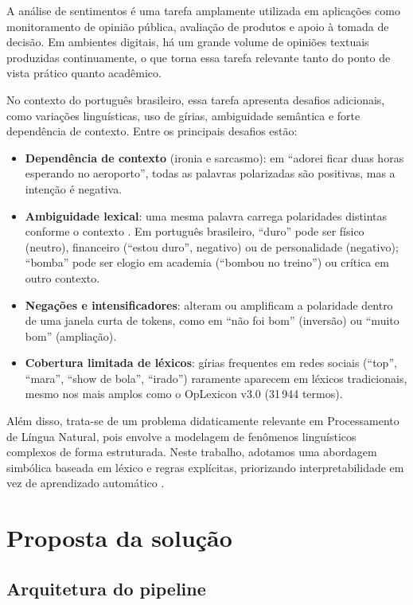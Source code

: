 \documentclass[11pt,a4paper]{article}
\newcommand{\new}[1]{\textcolor{newblue}{#1}}
\begin{document}
A análise de sentimentos é uma tarefa amplamente utilizada em aplicações como monitoramento de opinião pública, avaliação de produtos e apoio à tomada de decisão. Em ambientes digitais, há um grande volume de opiniões textuais produzidas continuamente, o que torna essa tarefa relevante tanto do ponto de vista prático quanto acadêmico.

No contexto do português brasileiro, essa tarefa apresenta desafios adicionais, como variações linguísticas, uso de gírias, ambiguidade semântica e forte dependência de contexto. Entre os principais desafios estão:

\begin{itemize}
  \item \textbf{Dependência de contexto} (ironia e sarcasmo)\new{: em ``adorei ficar duas horas esperando no aeroporto'', todas as palavras polarizadas são positivas, mas a intenção é negativa.}
  \item \textbf{Ambiguidade lexical}\new{: uma mesma palavra carrega polaridades distintas conforme o contexto \citep{navigli2009wsd}. Em português brasileiro, ``duro'' pode ser físico (neutro), financeiro (``estou duro'', negativo) ou de personalidade (negativo); ``bomba'' pode ser elogio em academia (``bombou no treino'') ou crítica em outro contexto.}
  \item \textbf{Negações e intensificadores}\new{: alteram ou amplificam a polaridade dentro de uma janela curta de tokens, como em ``não foi bom'' (inversão) ou ``muito bom'' (ampliação).}
  \item \textbf{Cobertura limitada de léxicos}\new{: gírias frequentes em redes sociais (``top'', ``mara'', ``show de bola'', ``irado'') raramente aparecem em léxicos tradicionais, mesmo nos mais amplos como o OpLexicon v3.0 (31\,944 termos).}
\end{itemize}

Além disso, trata-se de um problema didaticamente relevante em Processamento de Língua Natural, pois envolve a modelagem de fenômenos linguísticos complexos de forma estruturada. Neste trabalho, adotamos uma abordagem simbólica baseada em léxico e regras explícitas, priorizando interpretabilidade em vez de aprendizado automático \citep{taboada2011lexicon,hutto2014vader,souza2012sentiment}.

\section{Proposta da solução}

\subsection{Arquitetura do pipeline}
\end{document}
